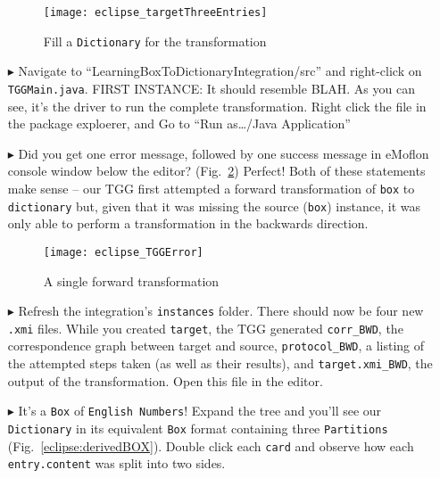 \begin{itemize}
\vspace{0.5cm}

\begin{figure}[htbp]
\begin{center}
  \texttt{[image: eclipse\_targetThreeEntries]}
  \caption{Fill a \texttt{Dictionary} for the transformation}
  \label{eclipse:dictionaryxmi}
\end{center}
\end{figure}

\item[$\blacktriangleright$] Navigate to ``LearningBox\-To\-Dictionary\-In\-te\-gra\-tion\-/src'' and right-click on \texttt{TGGMain.java}. 
\update FIRST INSTANCE: It should resemble BLAH. As you can see, it's the driver to run the complete transformation. Right click the file in the package
exploerer, and Go to ``Run as\ldots/Java Application''

\vspace{0.5cm}

\item[$\blacktriangleright$] Did you get one error message, followed by one success message in eMoflon console window below the editor?
(Fig.~\ref{eclipse:tggERROR}) Perfect! Both of these statements make sense -- our TGG first attempted a forward transformation of \texttt{box} to
\texttt{dictionary} but, given that it was missing the source (\texttt{box}) instance, it was only able to perform a transformation in the backwards direction.

\begin{figure}[htbp]
\begin{center}
  \texttt{[image: eclipse\_TGGError]}
  \caption{A single forward transformation}
  \label{eclipse:tggERROR}
\end{center}
\end{figure}

\newpage

\item[$\blacktriangleright$] Refresh the integration's \texttt{instances} folder. There should now be four new \texttt{.xmi} files. While you created
\texttt{target}, the TGG generated \texttt{corr\_BWD}, the correspondence graph between target and source, \texttt{protocol\_BWD}, a listing of the attempted
steps taken (as well as their results), and \texttt{target.xmi\_BWD}, the output of the transformation. Open this file in the editor.

\item[$\blacktriangleright$] It's a \texttt{Box} of \texttt{English Numbers}! Expand the tree and you'll see our \texttt{Dictionary} in its equivalent
\texttt{Box} format containing three \texttt{Par\-ti\-tions} (Fig.~\ref{eclipse:derivedBOX}). Double click each \texttt{card} and observe how each
\texttt{entry.content} was split into two sides.


\end{itemize}
